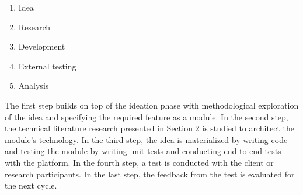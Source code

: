 \documentclass{article}
\begin{document}
\begin{enumerate}
	\item Idea
	\item Research
	\item Development
	\item External testing
	\item Analysis
\end{enumerate}

The first step builds on top of the ideation phase with methodological exploration of the idea and specifying the required feature as a module. In the second step, the technical literature research presented in Section 2 is studied to architect the module's technology. In the third step, the idea is materialized by writing code and testing the module by writing unit tests and conducting end-to-end tests with the platform. In the fourth step, a test is conducted with the client or research participants. In the last step, the feedback from the test is evaluated for the next cycle.
\end{document}
